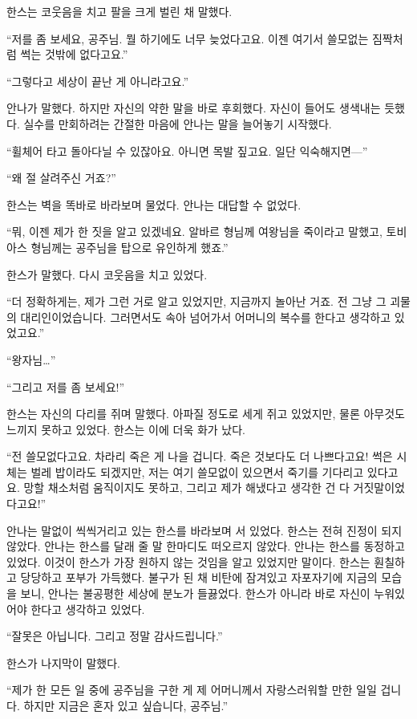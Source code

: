 한스는 코웃음을 치고 팔을 크게 벌린 채 말했다.

``저를 좀 보세요, 공주님. 뭘 하기에도 너무 늦었다고요. 이젠 여기서 쓸모없는 짐짝처럼 썩는 것밖에 없다고요.''

``그렇다고 세상이 끝난 게 아니라고요.''

안나가 말했다. 하지만 자신의 약한 말을 바로 후회했다. 자신이 들어도 생색내는 듯했다. 실수를 만회하려는 간절한 마음에 안나는 말을 늘어놓기 시작했다.

``휠체어 타고 돌아다닐 수 있잖아요. 아니면 목발 짚고요. 일단 익숙해지면—''

``왜 절 살려주신 거죠?''

한스는 벽을 똑바로 바라보며 물었다. 안나는 대답할 수 없었다.

``뭐, 이젠 제가 한 짓을 알고 있겠네요. 알바르 형님께 여왕님을 죽이라고 말했고, 토비아스 형님께는 공주님을 탑으로 유인하게 했죠.''

한스가 말했다. 다시 코웃음을 치고 있었다.

``더 정확하게는, 제가 그런 거로 알고 있었지만, 지금까지 놀아난 거죠. 전 그냥 그 괴물의 대리인이었습니다. 그러면서도 속아 넘어가서 어머니의 복수를 한다고 생각하고 있었고요.''

``왕자님\ldots''

``그리고 저를 좀 보세요!''

한스는 자신의 다리를 쥐며 말했다. 아파질 정도로 세게 쥐고 있었지만, 물론 아무것도 느끼지 못하고 있었다. 한스는 이에 더욱 화가 났다.

``전 쓸모없다고요. 차라리 죽은 게 나을 겁니다. 죽은 것보다도 더 나쁘다고요! 썩은 시체는 벌레 밥이라도 되겠지만, 저는 여기 쓸모없이 있으면서 죽기를 기다리고 있다고요. 망할 채소처럼 움직이지도 못하고, 그리고 제가 해냈다고 생각한 건 다 거짓말이었다고요!''

안나는 말없이 씩씩거리고 있는 한스를 바라보며 서 있었다. 한스는 전혀 진정이 되지 않았다. 안나는 한스를 달래 줄 말 한마디도 떠오르지 않았다. 안나는 한스를 동정하고 있었다. 이것이 한스가 가장 원하지 않는 것임을 알고 있었지만 말이다. 한스는 훤칠하고 당당하고 포부가 가득했다. 불구가 된 채 비탄에 잠겨있고 자포자기에 지금의 모습을 보니, 안나는 불공평한 세상에 분노가 들끓었다. 한스가 아니라 바로 자신이 누워있어야 한다고 생각하고 있었다.

`` 잘못은 아닙니다. 그리고 정말 감사드립니다.''

한스가 나지막이 말했다.

``제가 한 모든 일 중에 공주님을 구한 게 제 어머니께서 자랑스러워할 만한 일일 겁니다. 하지만 지금은 혼자 있고 싶습니다, 공주님.''

